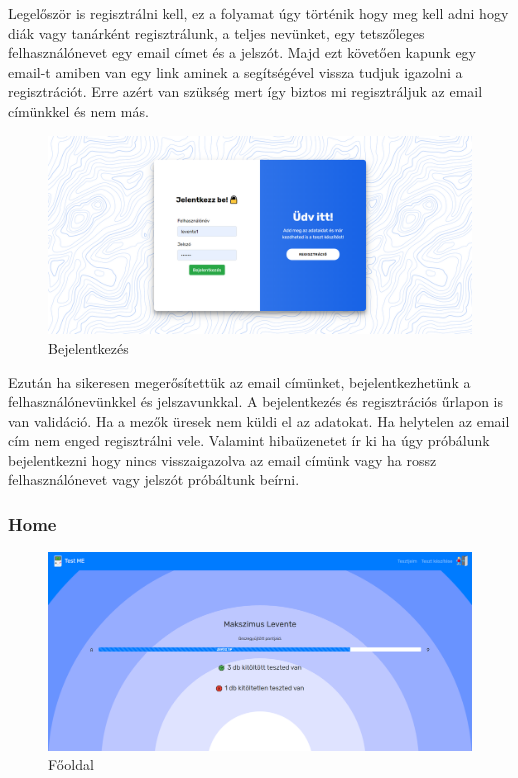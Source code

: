 Legelőször is regisztrálni kell, ez a folyamat úgy történik hogy meg kell adni hogy diák vagy tanárként regisztrálunk, a teljes nevünket, egy tetszőleges felhasználónevet egy email címet és a jelszót. Majd ezt követően kapunk egy email-t amiben van egy link aminek a segítségével vissza tudjuk igazolni a regisztrációt. Erre azért van szükség mert így biztos mi regisztráljuk az email címünkkel és nem más.

\begin{figure}[H]
    \centering
    \includegraphics[width=\linewidth]{images/login.png}
    \caption{Bejelentkezés}
\end{figure}

Ezután ha sikeresen megerősítettük az email címünket, bejelentkezhetünk a felhasználónevünkkel és jelszavunkkal.
A bejelentkezés és regisztrációs űrlapon is van validáció. Ha a mezők üresek nem küldi el az adatokat. Ha helytelen az email cím nem enged regisztrálni vele. Valamint hibaüzenetet ír ki ha úgy próbálunk bejelentkezni hogy nincs visszaigazolva az email címünk vagy ha rossz felhasználónevet vagy jelszót próbáltunk beírni.

\subsubsection{Home}

\begin{figure}[H]
    \centering
    \includegraphics[width=\linewidth]{images/home.png}
    \caption{Főoldal}
\end{figure}

